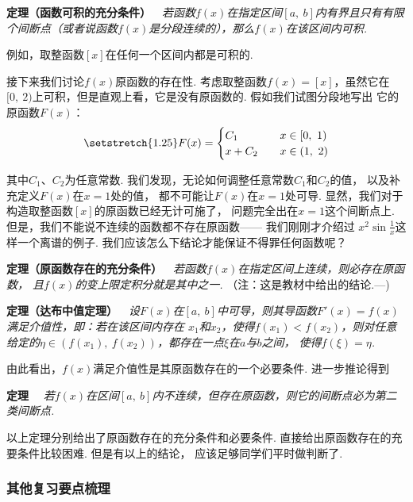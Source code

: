 \textbf{定理（函数可积的充分条件）}~~\textit{若函数$f(x)$在指定区间$[a,~b]$内有界且只有有限个间断点（或者说函数$f(x)$是分段连续的），那么$f(x)$在该区间内可积.}

例如，取整函数$[x]$在任何一个区间内都是可积的. \vspace{0.5em}

接下来我们讨论$f(x)$原函数的存在性.
考虑取整函数$f(x)=[x]$，虽然它在$[0,~2)$上可积，但是直观上看，它是没有原函数的. 假如我们试图分段地写出
它的原函数$F(x)$：
\[
\setstretch{1.25}
F(x) =
\begin{cases}
C_{1} &\quad x \in [0,~1) \\
x+C_{2} &\quad x \in (1,~2) \\
\end{cases}
\] 

其中$C_{1}$、$C_{2}$为任意常数.
我们发现，无论如何调整任意常数$C_{1}$和$C_{2}$的值，
以及补充定义$F(x)$在$x=1$处的值，
都不可能让$F(x)$在$x=1$处可导.
显然，我们对于构造取整函数$[x]$的原函数已经无计可施了，
问题完全出在$x=1$这个间断点上.
但是，我们不能说不连续的函数都不存在原函数——
我们刚刚才介绍过
$x^{2}\sin \displaystyle\frac{1}{x}$这样一个离谱的例子.
我们应该怎么下结论才能保证不得罪任何函数呢？\par \vspace{0.5em}

\textbf{定理（原函数存在的充分条件）}~~\textit{若函数$f(x)$在指定区间上连续，则必存在原函数，
且$f(x)$的变上限定积分就是其中之一.}\vspace{0.5em}
（注：这是教材中给出的结论.—)\vspace{0.5em}

\textbf{定理（达布中值定理）}~~\textit{设$F(x)$在$[a,~b]$中可导，则其导函数$F'(x)=f(x)$满足介值性，即：若在该区间内存在
$x_{1}$和$x_{2}$，使得$f(x_{1})<f(x_2)$，则对任意给定的$\eta \in (f(x_{1}),~f(x_{2})) $，都存在一点$\xi $在$a$与$b$之间，
使得$f(\xi) = \eta$.} \vspace{0.5em}

由此看出，$f(x)$满足介值性是其原函数存在的一个必要条件.
进一步推论得到 \vspace{0.5em}

\textbf{定理}~~
\textit{若$f(x)$在区间$[a,~b]$内不连续，但存在原函数，则它的间断点必为第二类间断点.} \vspace{0.5em}

以上定理分别给出了原函数存在的充分条件和必要条件.
直接给出原函数存在的充要条件比较困难.
但是有以上的结论，
应该足够同学们平时做判断了.

\subsubsection{其他复习要点梳理}

